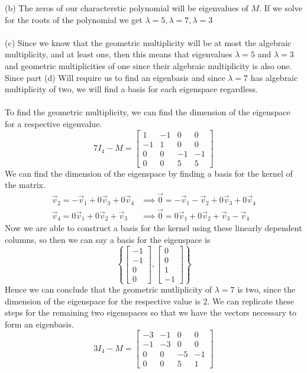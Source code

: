 \documentclass{report}
\begin{document}
(b) The zeros of our characterstic polynomial will be eigenvalues of $M$.  If we solve for the roots of the polynomial we get $\lambda=5,\lambda=7,\lambda=3$\\
\\
\noindent (c) Since we know that the geometric multiplicity will be at most the algebraic multiplicity,  and at least one,  then this means that eigenvalues $\lambda=5$ and $\lambda=3$ and geometric multiplicities of one since their algebraic multiplicity is also one.  Since part (d) Will require us to find an eigenbasis and since $\lambda=7$ has algebraic multiplicity of two,  we will find a basis for each eigenspace regardless. \\
\\
To find the geometric multiplicity,  we can find the dimension of the eigenspace for a respective eigenvalue.
$$
7I_4 - M = \begin{bmatrix}
1& -1 & 0 & 0 \\
-1 &1 & 0 & 0 \\
0 & 0 & -1& -1 \\
0 & 0 & 5 &5
\end{bmatrix}
$$
We can find the dimension of the eigenspace by finding a basis for the kernel of the matrix.
$$
\begin{aligned}
\vec{v}_2 = -\vec{v}_1 + 0\vec{v}_3 + 0\vec{v}_4 &\implies \vec{0} = -\vec{v}_1 - \vec{v}_2 + 0\vec{v}_3 + 0\vec{v}_4 \\
\vec{v}_4 = 0\vec{v}_1 + 0\vec{v}_2 + \vec{v}_3 &\implies \vec{0} = 0\vec{v}_1 + 0\vec{v}_2 + \vec{v}_3 - \vec{v}_4
\end{aligned}
$$
Now we are able to construct a basis for the kernel using these linearly dependent columns,  so then we can say a basis for the eigenspace is
$$
\left\{
\begin{bmatrix}-1\\-1\\0\\0\end{bmatrix},
\begin{bmatrix}0\\0\\1\\-1\end{bmatrix}
\right\}
$$
Hence we can conclude that the geometric mutliplicity of $\lambda=7$ is two,  since the dimension of the eigenspace for the respective value is 2.  We can replicate these steps for the remaining two eigenspaces so that we have the vectors necessary to form an eigenbasis.
$$
3I_4 - M = \begin{bmatrix}
-3& -1 & 0 & 0 \\
-1& -3 & 0 & 0 \\
0 & 0 & -5 & -1 \\
0 & 0 & 5 & 1
\end{bmatrix}
$$
\end{document}
